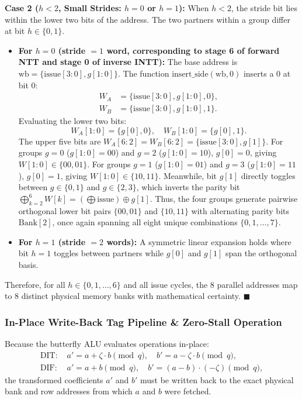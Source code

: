 \textbf{Case 2 ($h < 2$, Small Strides: $h = 0$ or $h = 1$):}
When $h < 2$, the stride bit lies within the lower two bits of the address. The two partners within a group differ at bit $h \in \{0, 1\}$. 
\begin{itemize}
    \item \textbf{For $h = 0$ (stride $= 1$ word, corresponding to stage 6 of forward NTT and stage 0 of inverse INTT):}
    The base address is $\text{wb} = \{\text{issue}[3:0], g[1:0]\}$. The function $\text{insert\_side}(\text{wb}, 0)$ inserts a 0 at bit 0:
    \begin{align}
    W_A &= \{\text{issue}[3:0], g[1:0], 0\}, \\
    W_B &= \{\text{issue}[3:0], g[1:0], 1\}.
    \end{align}
    Evaluating the lower two bits:
    \begin{equation}
    W_A[1:0] = \{g[0], 0\}, \quad W_B[1:0] = \{g[0], 1\}.
    \end{equation}
    The upper five bits are $W_A[6:2] = W_B[6:2] = \{\text{issue}[3:0], g[1]\}$.
    For groups $g = 0$ ($g[1:0] = 00$) and $g = 2$ ($g[1:0] = 10$), $g[0] = 0$, giving $W[1:0] \in \{00, 01\}$. For groups $g = 1$ ($g[1:0] = 01$) and $g = 3$ ($g[1:0] = 11$), $g[0] = 1$, giving $W[1:0] \in \{10, 11\}$. 
    Meanwhile, bit $g[1]$ directly toggles between $g \in \{0, 1\}$ and $g \in \{2, 3\}$, which inverts the parity bit $\bigoplus_{k=2}^6 W[k] = (\bigoplus \text{issue}) \oplus g[1]$. Thus, the four groups generate pairwise orthogonal lower bit pairs $\{00, 01\}$ and $\{10, 11\}$ with alternating parity bits $\text{Bank}[2]$, once again spanning all eight unique combinations $\{0, 1, \dots, 7\}$.
    
    \item \textbf{For $h = 1$ (stride $= 2$ words):}
    A symmetric linear expansion holds where bit $h=1$ toggles between partners while $g[0]$ and $g[1]$ span the orthogonal basis.
\end{itemize}

Therefore, for all $h \in \{0, 1, \dots, 6\}$ and all issue cycles, the 8 parallel addresses map to 8 distinct physical memory banks with mathematical certainty. $\blacksquare$

\subsubsection{In-Place Write-Back Tag Pipeline \& Zero-Stall Operation}
Because the butterfly ALU evaluates operations in-place:
\begin{align}
\text{DIT: } & a' = a + \zeta \cdot b \pmod q, \quad b' = a - \zeta \cdot b \pmod q, \label{eq:dit_alu} \\
\text{DIF: } & a' = a + b \pmod q, \quad b' = (a - b) \cdot (-\zeta) \pmod q, \label{eq:dif_alu}
\end{align}
the transformed coefficients $a'$ and $b'$ must be written back to the exact physical bank and row addresses from which $a$ and $b$ were fetched.

